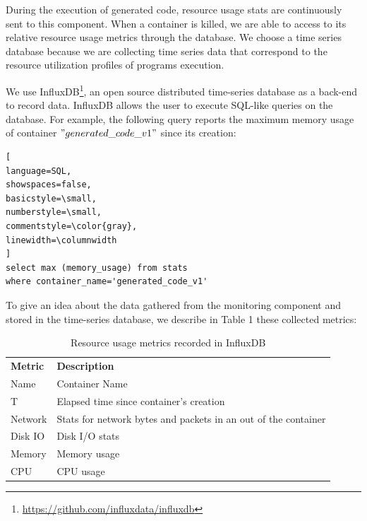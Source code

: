 During the execution of generated code, resource usage stats are continuously sent to this component. When a container is killed, we are able to access to its relative resource usage metrics through the database. We choose a time series database because we are collecting time series data that correspond to the resource utilization profiles of programs execution.

We use InfluxDB\footnote{\url{https://github.com/influxdata/influxdb}}, an open source distributed time-series database as a back-end to record data. InfluxDB allows the user to execute SQL-like queries on the database. For example, the following query reports the maximum memory usage of container $"generated\_code\_v1"$ since its creation:

\begin{lstlisting}[
language=SQL,
showspaces=false,
basicstyle=\small,
numberstyle=\small,
commentstyle=\color{gray},
linewidth=\columnwidth
]
select max (memory_usage) from stats 
where container_name='generated_code_v1'
\end{lstlisting}
To give an idea about the data gathered from the monitoring component and stored in the time-series database, we describe in Table 1 these collected metrics:
\begin{table}[h]
	\begin{center}
		\begin{tabular}{|p{1cm}|p{6.6cm}|}
			\hline
			\textbf{Metric} & \textbf{Description} \\
			\hhline{|=|=|}	
			Name & Container Name \\\hline
			
			T & Elapsed time since container's creation \\\hline
			
			Network  &  Stats for network bytes and packets in an out of the container \\\hline
			
			Disk IO &  Disk I/O stats \\\hline
			
			Memory  &  Memory usage \\\hline
			
			CPU &  CPU usage \\
			\hline
			
		\end{tabular}
		
	\end{center}
	\caption {Resource usage metrics recorded in InfluxDB}
\end{table}

